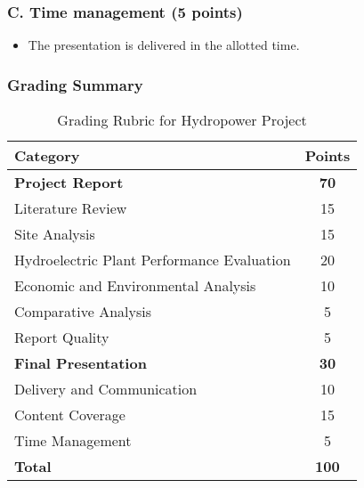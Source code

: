 \documentclass[11pt]{article}
\begin{document}
\subsubsection*{C. Time management (5 points)}
\begin{itemize}
    \item The presentation is delivered in the allotted time.
\end{itemize}

\subsubsection*{Grading Summary}
\begin{table}[h!]
    \centering
    \begin{tabular}{|l|c|}
        \hline
        \textbf{Category} & \textbf{Points} \\
        \hline
        \textbf{Project Report} & \textbf{70} \\
        Literature Review & 15 \\
        Site Analysis & 15 \\
        Hydroelectric Plant Performance Evaluation& 20 \\
        Economic and Environmental Analysis & 10 \\
        Comparative Analysis & 5 \\
        Report Quality & 5 \\
        \hline
        \textbf{Final Presentation} & \textbf{30} \\
        Delivery and Communication & 10 \\
        Content Coverage & 15 \\
        Time Management & 5 \\
        \hline
        \textbf{Total} & \textbf{100} \\
        \hline
    \end{tabular}
    \caption{Grading Rubric for Hydropower Project}
\end{table}
\end{document}
